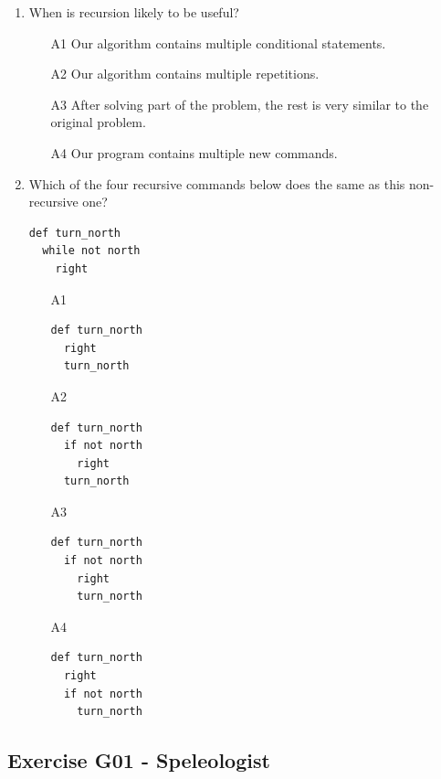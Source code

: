\documentclass[article,A4,12pt]{llncs}
\begin{document}
{{{{\begin{enumerate}
\begin{enumerate}
\end{enumerate}
\item When is recursion likely to be useful?
\begin{enumerate}
\item[A1] Our algorithm contains multiple conditional statements.
\item[A2] Our algorithm contains multiple repetitions.
\item[A3] After solving part of the problem, the rest is very similar to the original problem.
\item[A4] Our program contains multiple new commands.
\end{enumerate}
\item Which of the four recursive commands below does the same as this non-recursive one?
\begin{verbatim}
def turn_north
  while not north
    right
\end{verbatim}
\begin{enumerate}
\item[A1]
\begin{verbatim}
def turn_north
  right
  turn_north
\end{verbatim}
\item[A2] 
\begin{verbatim}
def turn_north
  if not north
    right
  turn_north
\end{verbatim}
\item[A3] 
\begin{verbatim}
def turn_north
  if not north
    right
    turn_north
\end{verbatim}
\item[A4] 
\begin{verbatim}
def turn_north
  right
  if not north 
    turn_north
\end{verbatim}
\end{enumerate}

\end{enumerate}

\subsection{Exercise G01 - Speleologist}

}}}}
\end{document}
